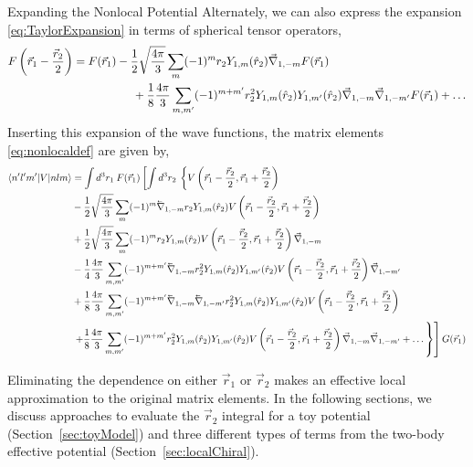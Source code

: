 \begin{section}{Expanding the Nonlocal Potential}
Alternately, we can also express the expansion \eqref{eq:TaylorExpansion} in terms of spherical tensor operators,
\begin{align}
\begin{split}
F\left(\vec{r}_1-\frac{\vec{r}_2}{2}\right)=
F(\vec{r}_1)&-\frac{1}{2}\sqrt{\frac{4\pi}{3}}\sum_{m}(-1)^m r_2 Y_{1,m}(\hat{r}_2) \vec{\nabla}_{1,-m} F(\vec{r}_1) \\
&\hspace{.5cm}+\frac{1}{8}\frac{4\pi}{3}\sum_{m,m'}(-1)^{m+m'}r_2^2 Y_{1,m}(\hat{r}_2)Y_{1,m'}(\hat{r}_2)\vec{\nabla}_{1,-m}\vec{\nabla}_{1,-m'}F(\vec{r}_1)
+\dots 
\end{split}
\end{align}
Inserting this expansion of the wave functions, the matrix elements \eqref{eq:nonlocaldef} are given by,
\begin{equation}\label{eq:expansionSpherical}
\begin{split}
\braket{n' l' m'| V | n l m} &= \int d^3r_1\: F(\vec{r}_1)\left[\int d^3r_2\:\left\{V\left(\vec{r}_1-\frac{\vec{r}_2}{2},\vec{r}_1+\frac{\vec{r}_2}{2}\right) \right.\right. \\
&-\frac{1}{2}\sqrt{\frac{4\pi}{3}}\sum_m (-1)^m \lvec{\nabla}_{1,-m} r_2Y_{1,m}(\hat{r}_2)V\left(\vec{r}_1-\frac{\vec{r}_2}{2},\vec{r}_1+\frac{\vec{r}_2}{2}\right)\\
&+\frac{1}{2}\sqrt{\frac{4\pi}{3}}\sum_m (-1)^m r_2Y_{1,m}(\hat{r}_2)V\left(\vec{r}_1-\frac{\vec{r}_2}{2},\vec{r}_1+\frac{\vec{r}_2}{2}\right) \vec{\nabla}_{1,-m} \\
&-\frac{1}{4}\frac{4\pi}{3}\sum_{m,m'}(-1)^{m+m'}\lvec{\nabla}_{1,-m} r_2^2 Y_{1,m}(\hat{r}_2)Y_{1,m'}(\hat{r}_2)V\left(\vec{r}_1-\frac{\vec{r}_2}{2},\vec{r}_1+\frac{\vec{r}_2}{2}\right) \vec{\nabla}_{1,-m'}\\
&+\frac{1}{8}\frac{4\pi}{3}\sum_{m,m'}(-1)^{m+m'}\lvec{\nabla}_{1,-m}\lvec{\nabla}_{1,-m'} r_2^2 Y_{1,m}(\hat{r}_2)Y_{1,m'}(\hat{r}_2)V\left(\vec{r}_1-\frac{\vec{r}_2}{2},\vec{r}_1+\frac{\vec{r}_2}{2}\right) \\
&\left.\left.+\frac{1}{8}\frac{4\pi}{3}\sum_{m,m'}(-1)^{m+m'} r_2^2 Y_{1,m}(\hat{r}_2)Y_{1,m'}(\hat{r}_2)V\left(\vec{r}_1-\frac{\vec{r}_2}{2},\vec{r}_1+\frac{\vec{r}_2}{2}\right)\vec{\nabla}_{1,-m}\vec{\nabla}_{1,-m'}+\dots \right\}\right]G(\vec{r}_1)
\end{split}
\end{equation}

Eliminating the dependence on either $\vec{r}_1$ or $\vec{r}_2$ makes an effective local approximation to the original matrix elements. In the following sections, we discuss approaches to evaluate the $\vec{r}_2$ integral for a toy potential (Section~\ref{sec:toyModel}) and three different types of terms from the two-body effective potential (Section~\ref{sec:localChiral}).

\end{section}

